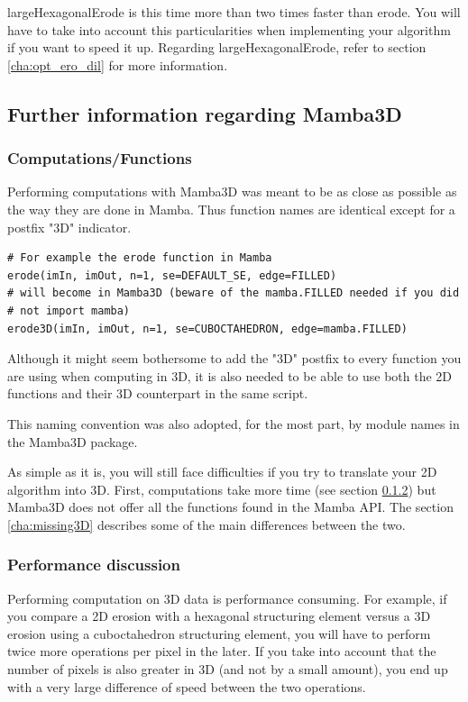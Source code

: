 \documentclass[a4paper,10pt,oneside]{article}
\begin{document}
largeHexagonalErode is this time more than two times faster than erode. You will
have to take into account this particularities when implementing your algorithm
if you want to speed it up. Regarding largeHexagonalErode, refer to section 
\ref{cha:opt_ero_dil} for more information.

\pagebreak

\subsection{Further information regarding Mamba3D}

\subsubsection{Computations/Functions}

Performing computations with Mamba3D was meant to be as close as possible
as the way they are done in Mamba. Thus function names are identical except
for a postfix "3D" indicator.

\lstset{language=Python}
\begin{lstlisting}
# For example the erode function in Mamba
erode(imIn, imOut, n=1, se=DEFAULT_SE, edge=FILLED)
# will become in Mamba3D (beware of the mamba.FILLED needed if you did 
# not import mamba)
erode3D(imIn, imOut, n=1, se=CUBOCTAHEDRON, edge=mamba.FILLED)
\end{lstlisting}

Although it might seem bothersome to add the "3D" postfix to every
function you are using when computing in 3D, it is also needed to be able to
use both the 2D functions and their 3D counterpart in the same script.

This naming convention was also adopted, for the most part, by module
names in the Mamba3D package.

As simple as it is, you will still face difficulties if you try to translate
your 2D algorithm into 3D. First, computations take more time (see section
\ref{cha:perfo3D}) but Mamba3D does not offer all the functions found in
the Mamba API. The section \ref{cha:missing3D} describes some of the 
main differences between the two.

\subsubsection{Performance discussion}
\label{cha:perfo3D}

Performing computation on 3D data is performance consuming. For example, if
you compare a 2D erosion with a hexagonal structuring element versus a 3D
erosion using a cuboctahedron structuring element, you will have to perform
twice more operations per pixel in the later. If you take into account that
the number of pixels is also greater in 3D (and not by a small amount), you end
up with a very large difference of speed between the two operations.
\end{document}
